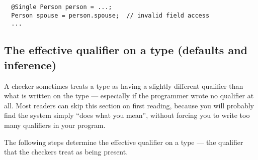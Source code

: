 \begin{Verbatim}
  @Single Person person = ...;
  Person spouse = person.spouse;  // invalid field access
  ...
\end{Verbatim}


\subsection{The effective qualifier on a type (defaults and inference)\label{effective-qualifier}}

A checker sometimes treats a type as having a slightly different qualifier
than what is written on the type --- especially if the programmer wrote no
qualifier at all.
Most readers can skip this section on first reading, because you will
probably find the system simply ``does what you mean'', without forcing
you to write too many qualifiers in your program.

  The following steps determine the effective
qualifier on a type --- the qualifier that the checkers treat as being present.

